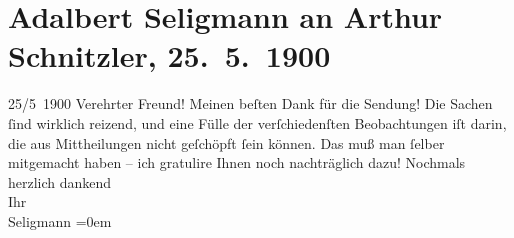 

         
         \newcommand{\erwaehntePersonen}{Personen: }
         \newcommand{\erwaehnteInstitutionen}{}
         \newcommand{\erwaehnteOrte}{Orte: Wien}
         \newcommand{\erwaehnteWerke}{Werke: Reigen. Zehn Dialoge}
               \section[Adalbert Seligmann an Arthur Schnitzler, 25. 5. 1900]{ Adalbert Seligmann an Arthur Schnitzler, 25. 5. 1900}\nopagebreak{}\rehead{ }\begin{ledgroupsized}[t]{13cm}\normalsize\beginnumbering \toendnotes[C]{\smallbreak\pagebreak[2]} 
\toendnotes[C]{\smallbreak}\pstart
           \raggedleft{}{\pb}25/5 1900\pend
           \pstart
           Verehrter Freund! Meinen beſten Dank für die Sendung! Die Sachen ſind wirklich
                    reizend, und eine Fülle der verſchiedenſten Beobachtungen iſt darin, die aus
                    Mittheilungen nicht geſchöpft ſein können. Das muß man ſelber mitgemacht haben –
                    ich gratulire Ihnen noch nachträglich dazu!\pend
           \pstart
           Nochmals herzlich dankend{\\[\baselineskip]}Ihr{\\[\baselineskip]}\spacefill\mbox{Seligmann}\pend
           \leftskip=0em{}
         
         \endnumbering{}\end{ledgroupsized}  \newcommand{\dateiname}{L01040}\newcommand{\titel}{Adalbert Seligmann an Arthur Schnitzler, 25. 5. 1900}\newcommand{\editorInnen}{Martin Anton Müller und Gerd-Hermann Susen}
      